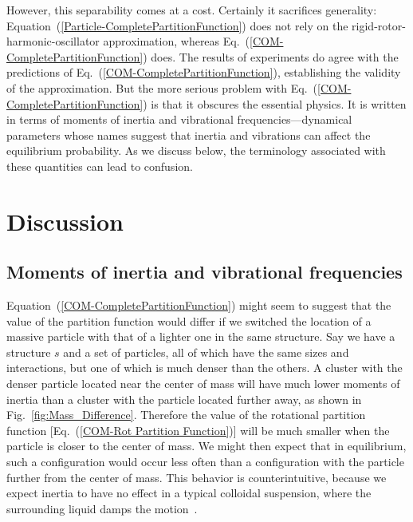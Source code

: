 \documentclass[pre, aps, twocolumn, reprint, amsmath,amssymb, showpacs,
superscriptaddress] {revtex4-1}
\begin{document}
However, this separability comes at a cost. Certainly it sacrifices
generality: Equation~(\ref{Particle-CompletePartitionFunction}) does not
rely on the rigid-rotor-harmonic-oscillator approximation, whereas
Eq.~(\ref{COM-CompletePartitionFunction}) does. The results of
experiments do agree with the predictions of
Eq.~(\ref{COM-CompletePartitionFunction}), establishing the validity of
the approximation. But the more serious problem with
Eq.~(\ref{COM-CompletePartitionFunction}) is that it obscures the
essential physics. It is written in terms of moments of inertia and
vibrational frequencies---dynamical parameters whose names suggest that
inertia and vibrations can affect the equilibrium probability. As we
discuss below, the terminology associated with these quantities can lead
to confusion.


\section{Discussion}
\label{sec:discussion}

\subsection{Moments of inertia and vibrational frequencies}\label{MassDependenceDerivation}

Equation~(\ref{COM-CompletePartitionFunction}) might seem to suggest
that the value of the partition function would differ if we switched the
location of a massive particle with that of a lighter one in the same
structure. Say we have a structure $s$ and a set of particles, all of
which have the same sizes and interactions, but one of which is much
denser than the others. A cluster with the denser particle located near
the center of mass will have much lower moments of inertia than a
cluster with the particle located further away, as shown in
Fig.~\ref{fig:Mass_Difference}. Therefore the value of the rotational
partition function [Eq.~(\ref{COM-Rot Partition Function})] will be much
smaller when the particle is closer to the center of mass. We might then
expect that in equilibrium, such a configuration would occur less often
than a configuration with the particle further from the center of mass.
This behavior is counterintuitive, because we expect inertia to have no
effect in a typical colloidal suspension, where the surrounding liquid
damps the motion~\cite{cates12}.
\end{document}

